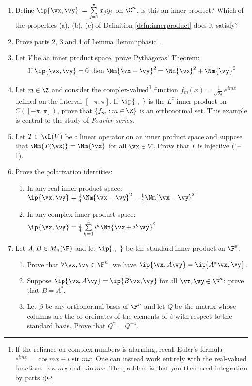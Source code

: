 \begin{exercises}
\begin{enumerate}[label=\thesubsection.\arabic*., align=right]
  \item Define $\ip{\vx,\vy}:=\sum\limits_{j=1}^nx_jy_j$ on $\C^n$. Is this an inner product? Which of the properties (a), (b), (c) of Definition \ref{defn:innerproduct} does it satisfy?
  
  \item Prove parts 2, 3 and 4 of Lemma \ref{lemm:ipbasic}.
  
  \item\label{ex:pythag} Let $V$ be an inner product space, prove Pythagoras' Theorem:
  \[\text{If }\ip{\vx,\vy}=0\text{ then }\Nm{\vx+\vy}^2=\Nm{\vx}^2+\Nm{\vy}^2\]
  
  
  
  \item\label{ex:fourier} Let $m\in\Z$ and consider the complex-valued\footnote{If the reliance on complex numbers is alarming, recall Euler's formula $e^{imx}=\cos mx+i\sin mx$. One can instead work entirely with the real-valued functions $\cos mx$ and $\sin mx$. The problem is that you then need integration by parts :(} function $f_m(x)=\frac 1{\sqrt{2\pi}}e^{imx}$ defined on the interval $[-\pi,\pi]$. If $\ip{\ ,\ }$ is the $L^2$ inner product on $C([-\pi,\pi])$, prove that $\{f_m:m\in\Z\}$ is an orthonormal set. This example is central to the study of \emph{Fourier series.}
	
	\item\label{ex:Tinj} Let $T\in\cL(V)$ be a linear operator on an inner product space and suppose that $\Nm{T(\vx)}=\Nm{\vx}$ for all $\vx\in V$. Prove that $T$ is injective (1--1).
	
	\item Prove the polarization identities:
	\begin{enumerate}
	  \item In any real inner product space: $\ip{\vx,\vy}=\frac 14\Nm{\vx+\vy}^2 -\frac 14\Nm{\vx-\vy}^2$
	  \item In any complex inner product space: $\ip{\vx,\vy}=\frac 14\sum\limits_{k=1}^4i^k\Nm{\vx+i^k\vy}^2$
	\end{enumerate}
	
	\item Let $A,B\in M_n(\F)$ and let $\ip{\ ,\ }$ be the standard inner product on $\F^n$.
	\begin{enumerate}
	  \item Prove that $\forall\vx,\vy\in \F^n$, we have $\ip{\vx,A\vy}=\ip{A^*\vx,\vy}$.
	  \item Suppose $\ip{\vx,A\vy}=\ip{B\vx,\vy}$ for all $\vx,\vy\in\F^n$: prove that $B=A^*$.
	  \item Let $\beta$ be any orthonormal basis of $\F^n$ and let $Q$ be the matrix whose columns are the co-ordinates of the elements of $\beta$ with respect to the standard basis. Prove that $Q^*=Q^{-1}$.
	\end{enumerate}
	
\end{enumerate}
\end{exercises}

